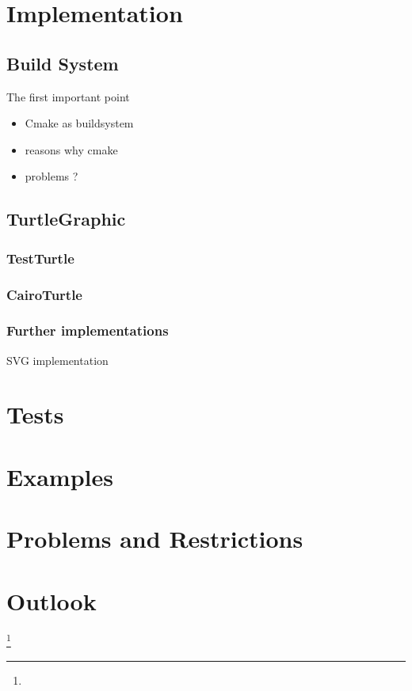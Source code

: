 \documentclass[english]{cpp-hmwk}
\begin{document}
\section{Implementation}
\subsection{Build System}
\label{section:buildsystem}
The first important point 

\begin{itemize}
	\item Cmake as buildsystem
	\item reasons why cmake
	\item problems ?
\end{itemize}


\subsection{TurtleGraphic}
\subsubsection{TestTurtle}
\subsubsection{CairoTurtle}
\subsubsection{Further implementations}
SVG implementation


\section{Tests}
\section{Examples}
\section{Problems and Restrictions}
\section{Outlook}
\footnote{}
\end{document}

